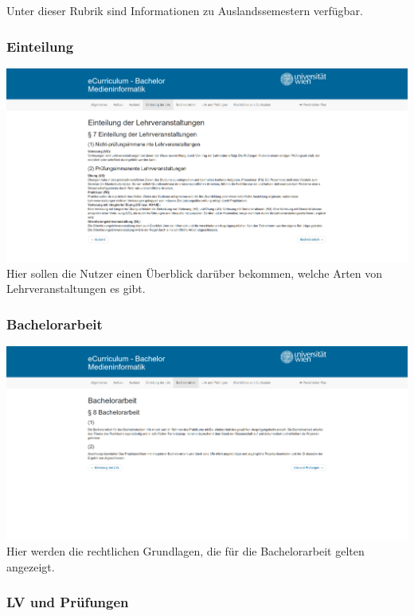 \documentclass[a4paper,10pt]{scrartcl}
\begin{document}
Unter dieser Rubrik sind Informationen zu Auslandssemestern verfügbar.

\subsubsection*{Einteilung}

\includegraphics[scale=0.19]{./hifi_screenshots/hifi_einteilung.png}\\

Hier sollen die Nutzer einen Überblick darüber bekommen, welche Arten von Lehrveranstaltungen es gibt.

\subsubsection*{Bachelorarbeit}

\includegraphics[scale=0.19]{./hifi_screenshots/hifi_bachelor.png}\\

Hier werden die rechtlichen Grundlagen, die für die Bachelorarbeit gelten angezeigt.

\subsubsection*{LV und Prüfungen}
\end{document}

